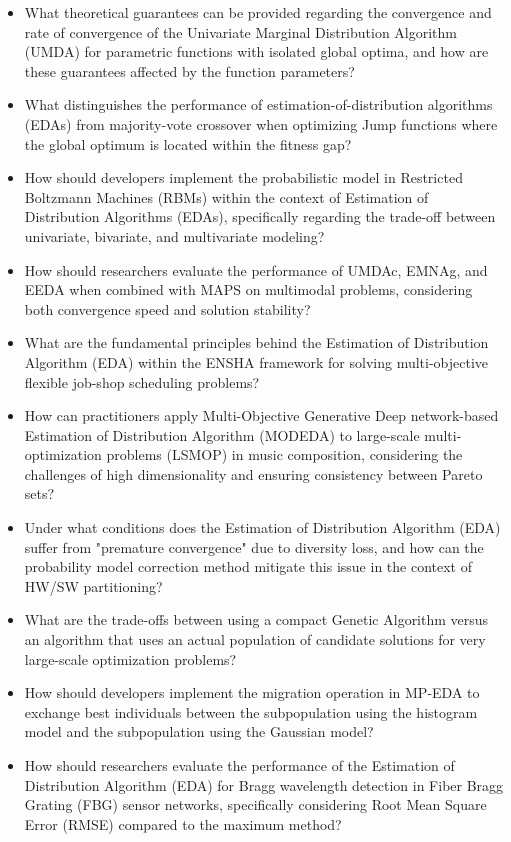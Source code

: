 \begin{itemize}[noitemsep]
    \item What theoretical guarantees can be provided regarding the convergence and rate of convergence of the Univariate Marginal Distribution Algorithm (UMDA) for parametric functions with isolated global optima, and how are these guarantees affected by the function parameters?
    \item What distinguishes the performance of estimation-of-distribution algorithms (EDAs) from majority-vote crossover when optimizing Jump functions where the global optimum is located within the fitness gap?
    \item How should developers implement the probabilistic model in Restricted Boltzmann Machines (RBMs) within the context of Estimation of Distribution Algorithms (EDAs), specifically regarding the trade-off between univariate, bivariate, and multivariate modeling?
    \item How should researchers evaluate the performance of UMDAc, EMNAg, and EEDA when combined with MAPS on multimodal problems, considering both convergence speed and solution stability?
    \item What are the fundamental principles behind the Estimation of Distribution Algorithm (EDA) within the ENSHA framework for solving multi-objective flexible job-shop scheduling problems?
    \item How can practitioners apply Multi-Objective Generative Deep network-based Estimation of Distribution Algorithm (MODEDA) to large-scale multi-optimization problems (LSMOP) in music composition, considering the challenges of high dimensionality and ensuring consistency between Pareto sets?
    \item Under what conditions does the Estimation of Distribution Algorithm (EDA) suffer from "premature convergence" due to diversity loss, and how can the probability model correction method mitigate this issue in the context of HW/SW partitioning?
    \item What are the trade-offs between using a compact Genetic Algorithm versus an algorithm that uses an actual population of candidate solutions for very large-scale optimization problems?
    \item How should developers implement the migration operation in MP-EDA to exchange best individuals between the subpopulation using the histogram model and the subpopulation using the Gaussian model?
    \item How should researchers evaluate the performance of the Estimation of Distribution Algorithm (EDA) for Bragg wavelength detection in Fiber Bragg Grating (FBG) sensor networks, specifically considering Root Mean Square Error (RMSE) compared to the maximum method?

\end{itemize}
